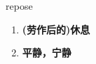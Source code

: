 
\begin{frame}
{\huge repose}
\begin{center}
\begin{enumerate}\Large
  \item \textbf{(劳作后的)休息}
  \item \textbf{平静，宁静}
\end{enumerate}
\end{center}
\end{frame}
